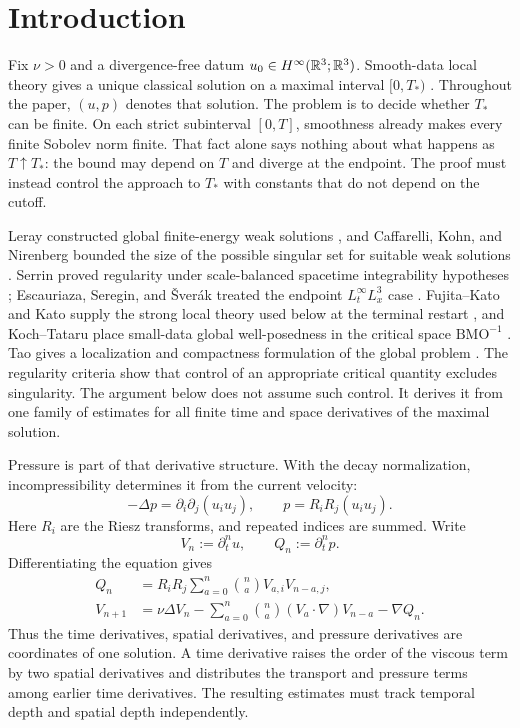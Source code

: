 \section{Introduction}
\label{sec:introduction}

Fix \(\nu>0\) and a divergence-free datum
\(u_0\in H^\infty(\mathbb R^3;\mathbb R^3)\).  Smooth-data local theory gives a unique
classical solution on a maximal interval \([0,T_*)\)
\cite{FujitaKato1964,Kato1984}.  Throughout the paper, \((u,p)\) denotes that
solution.  The problem is to decide whether \(T_*\) can be finite.  On each strict
subinterval \([0,T]\), smoothness already makes every finite Sobolev norm
finite.  That fact alone says nothing about what happens as \(T\uparrow T_*\):
the bound may depend on \(T\) and diverge at the endpoint.  The proof must
instead control the approach to \(T_*\) with constants that do not depend on
the cutoff.

Leray constructed global finite-energy weak solutions \cite{Leray1934}, and
Caffarelli, Kohn, and Nirenberg bounded the size of the possible singular set
for suitable weak solutions \cite{CKN1982}.  Serrin proved regularity under
scale-balanced spacetime integrability hypotheses \cite{Serrin1962};
Escauriaza, Seregin, and \v{S}ver\'ak treated the endpoint
\(L^\infty_tL^3_x\) case \cite{ESS2003}.  Fujita--Kato and Kato supply the
strong local theory used below at the terminal restart
\cite{FujitaKato1964,Kato1984}, and Koch--Tataru place small-data
global well-posedness in the critical space \(\mathrm{BMO}^{-1}\)
\cite{KochTataru2001}.
Tao gives a localization and compactness formulation of the global problem
\cite{Tao2013}.  The regularity criteria show that control of an appropriate
critical quantity excludes singularity.  The argument below does not assume
such control.  It derives it from one family of estimates for all finite time
and space derivatives of the maximal solution.

Pressure is part of that derivative structure.  With the decay normalization,
incompressibility determines it from the current velocity:
\[
 -\Delta p=\partial_i\partial_j(u_i u_j),
 \qquad
 p=R_iR_j(u_i u_j).
\]
Here \(R_i\) are the Riesz transforms, and repeated indices are summed.
Write
\[
 V_n:=\partial_t^nu,
 \qquad
 Q_n:=\partial_t^np.
\]
Differentiating the equation gives
\begin{align}
 Q_n
 &=R_iR_j\sum_{a=0}^{n}\binom naV_{a,i}V_{n-a,j},
 \label{eq:intro-pressure-recurrence}\\
 V_{n+1}
 &=\nu\Delta V_n
 -\sum_{a=0}^{n}\binom na(V_a\cdot\nabla)V_{n-a}
 -\nabla Q_n.
 \label{eq:intro-velocity-recurrence}
\end{align}
Thus the time derivatives, spatial derivatives, and pressure derivatives are
coordinates of one solution.  A time derivative raises the order of the
viscous term by two spatial derivatives and distributes the transport and
pressure terms among earlier time derivatives.  The resulting estimates must
track temporal depth and spatial depth independently.

